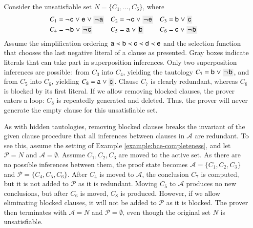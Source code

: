 \begin{exa}
   \label{example:bce-completeness}
   Consider the unsatisfiable set $N=\{ C_1, \ldots,\allowbreak C_6 \}$, where
   \begin{align*}
      C_1 &= \negpredlit{\cst{c}} \cor \pospredlit{\cst{e}} \cor \MAX{\negpredlit{\cst{a}}} 
      & C_2 &= \negpredlit{\cst{c}} \cor \MAX{\negpredlit{\cst{e}}}
      & C_3 &= \pospredlit{\cst{b}} \cor \MAX{\pospredlit{\cst{c}}}
      \\
      C_4 &= \negpredlit{\cst{b}} \cor \MAX{\negpredlit{\cst{c}}}
      & C_5 &= \pospredlit{\cst{a}} \cor \MAX{\pospredlit{\cst{b}}} 
      & C_6 &= \pospredlit{\cst{c}} \cor \MAX{\negpredlit{\cst{b}}} 
         &
   \end{align*}
   Assume the simplification ordering $\mathsf{a} \prec \mathsf{b} \prec \mathsf{c} \prec
   \mathsf{d} \prec \mathsf{e}$ and the selection function that chooses the last negative literal of a clause as
   presented. Gray boxes indicate literals that can take part in superposition
   inferences. Only two superposition inferences are
   possible:\ from $C_3$ into $C_4$, yielding the tautology $C_{7} = \pospredlit{\cst{b}} \cor
   \MAX{\negpredlit{\cst{b}}}$, and from $C_5$ into $C_6$, yielding $C_{8} = \pospredlit{\cst{a}} \cor
   \MAX{\pospredlit{\cst{c}}}$. Clause $C_{7}$ is
   clearly redundant, whereas $C_{8}$ is blocked by its first literal. If we
   allow removing blocked clauses, the prover enters a loop: $C_{8}$ is repeatedly generated and 
   deleted. Thus, the prover will never generate the
   empty clause for this unsatisfiable set.
\end{exa}

   \newcommand{\aset}{\mathcal{A}}
   \newcommand{\pset}{\mathcal{P}}
   As with hidden tautologies, removing blocked clauses breaks the invariant of
   the given clause procedure that all inferences between clauses in $\aset$ are
   redundant. To see this, assume the setting of Example
   \ref{example:bce-completeness}, and let $\pset = N$ and $\aset = \emptyset$.
   Assume $C_1, C_2, C_3$ are moved to the active set. As there are
   no possible inferences between them, the proof state becomes $\aset = \{C_1,
   C_2, C_3\}$ and $\pset = \{C_4,C_5,C_6\}$. After $C_4$ is moved to
   $\aset$, the conclusion $C_7$ is computed, but it is not added to $\pset$ as it
   is redundant. Moving $C_5$ to $\aset$ produces no new conclusions, but after
   $C_6$ is moved, $C_{8}$ is produced. However, if we allow eliminating blocked
   clauses, it will not be added to $\pset$ as it is blocked. The prover then
   terminates with $\aset=N$ and $\pset=\emptyset$, even though the original set
   $N$ is unsatisfiable.

